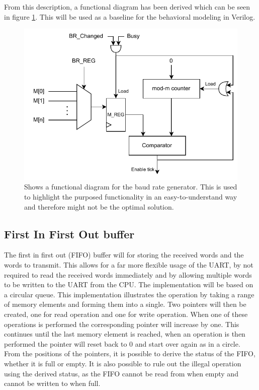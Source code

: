 \documentclass[./dissertation.tex]{subfiles}
\begin{document}
From this description, a functional diagram has been derived which can be seen in figure \ref{fig:uart_func_dia}. This will be used as a baseline for the behavioral modeling in Verilog.

\begin{figure}[H]
    \centering
    \includegraphics[width=0.9\linewidth]{subfiles/imgs/IP_Blocks_Pics/uart_func_dia.drawio.pdf}
    \caption{Shows a functional diagram for the baud rate generator. This is used to highlight the purposed functionality in an easy-to-understand way and therefore might not be the optimal solution.}
    \label{fig:uart_func_dia}
\end{figure}

\subsection{First In First Out buffer}
The first in first out (FIFO) buffer will for storing the received words and the words to transmit. This allows for a far more flexible usage of the UART, by not required to read the received words immediately and by allowing multiple words to be written to the UART from the CPU. The implementation will be based on a circular queue. This implementation illustrates the operation by taking a range of memory elements and forming them into a single. Two pointers will then be created, one for read operation and one for write operation. When one of these operations is performed the corresponding pointer will increase by one. This continues until the last memory element is reached, when an operation is then performed the pointer will reset back to 0 and start over again as in a circle. From the positions of the pointers, it is possible to derive the status of the FIFO, whether it is full or empty. It is also possible to rule out the illegal operation using the derived status, as the FIFO cannot be read from when empty and cannot be written to when full. 
\end{document}
